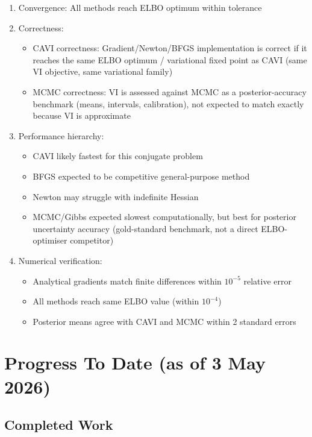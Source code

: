 \documentclass[11pt]{article}
\begin{document}
\begin{enumerate}
\item Convergence: All methods reach ELBO optimum within tolerance
\item Correctness:
\begin{itemize}
\item CAVI correctness: Gradient/Newton/BFGS implementation is correct if it reaches the same ELBO optimum / variational fixed point as CAVI (same VI objective, same variational family)
\item MCMC correctness: VI is assessed against MCMC as a posterior-accuracy benchmark (means, intervals, calibration), not expected to match exactly because VI is approximate
\end{itemize}
\item Performance hierarchy:
\begin{itemize} 
\item CAVI likely fastest for this conjugate problem
\item BFGS expected to be competitive general-purpose method
\item Newton may struggle with indefinite Hessian
\item MCMC/Gibbs expected slowest computationally, but best for posterior uncertainty accuracy (gold-standard benchmark, not a direct ELBO-optimiser competitor)
\end{itemize}
\item Numerical verification:
\begin{itemize}
\item Analytical gradients match finite differences within $10^{-5}$ relative error
\item All methods reach same ELBO value (within $10^{-4}$)
\item Posterior means agree with CAVI and MCMC within 2 standard errors
\end{itemize}
\end{enumerate}
 
\section*{Progress To Date (as of 3 May 2026)}

\subsection*{Completed Work}
\end{document}
